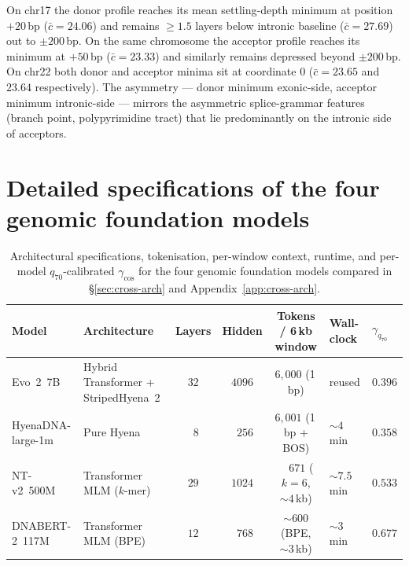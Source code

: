 \documentclass[12pt]{article}
\theoremstyle{plain}
\theoremstyle{definition}
\theoremstyle{remark}
\begin{document}
On chr17 the donor profile reaches its mean settling-depth minimum at
position $+20$\,bp ($\bar c = 24.06$) and remains $\ge 1.5$ layers
below intronic baseline ($\bar c = 27.69$) out to $\pm 200$\,bp. On
the same chromosome the acceptor profile reaches its minimum at
$+50$\,bp ($\bar c = 23.33$) and similarly remains depressed beyond
$\pm 200$\,bp. On chr22 both donor and acceptor minima sit at coordinate
$0$ ($\bar c = 23.65$ and $23.64$ respectively). The asymmetry --- donor
minimum exonic-side, acceptor minimum intronic-side --- mirrors the
asymmetric splice-grammar features (branch point, polypyrimidine tract)
that lie predominantly on the intronic side of acceptors.

\section{Detailed specifications of the four genomic foundation models}
\label{app:fm-specs}

\begin{table}[h]
\caption{Architectural specifications, tokenisation, per-window context,
runtime, and per-model $q_{70}$-calibrated $\gamma_{\cos}$ for the four
genomic foundation models compared in \S\ref{sec:cross-arch} and
Appendix~\ref{app:cross-arch}.}
\label{tab:fm-specs}
\centering
\footnotesize
\setlength{\tabcolsep}{4pt}
\begin{tabular}{@{}llcccll@{}}
\toprule
Model & Architecture & Layers & Hidden & Tokens / 6\,kb window
   & Wall-clock & $\gamma_{q_{70}}$ \\
\midrule
Evo~2~7B          & Hybrid Transformer + StripedHyena~2 & $32$ & $4096$
   & $6{,}000$ (1\,bp)         & reused      & $0.396$ \\
HyenaDNA-large-1m & Pure Hyena                          & $\phantom{0}8$ & $\phantom{0}256$
   & $6{,}001$ (1\,bp + BOS)   & $\sim 4$\,min    & $0.358$ \\
NT-v2~500M        & Transformer MLM ($k$-mer)           & $29$ & $1024$
   & $\phantom{0,}671$ ($k=6$, $\sim 4$\,kb) & $\sim 7.5$\,min  & $0.533$ \\
DNABERT-2~117M    & Transformer MLM (BPE)               & $12$ & $\phantom{0}768$
   & $\sim 600$ (BPE, $\sim 3$\,kb)        & $\sim 3$\,min    & $0.677$ \\
\bottomrule
\end{tabular}
\end{table}
\end{document}
